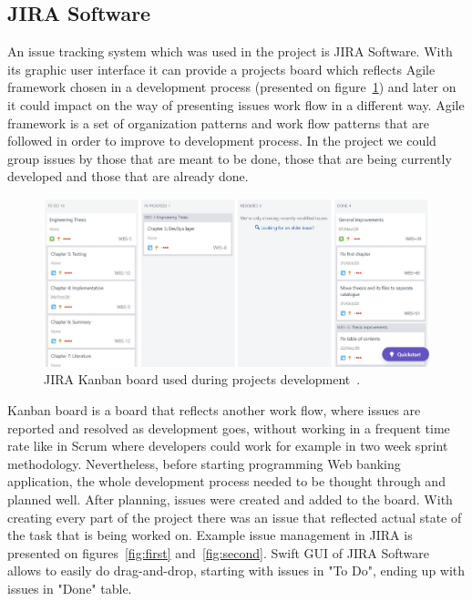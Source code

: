 \documentclass[a4paper,12pt]{book}
\newcommand\tab[1][1cm]{\hspace*{#1}}
\begin{document}
\subsection{JIRA Software}
{
\tab An issue tracking system which was used in the project is JIRA Software. With its graphic user interface it can provide a projects board  which reflects Agile framework chosen in a development process (presented on figure~\ref{fig:jiraboard}) and later on it could impact on the way of presenting issues work flow in a different way. Agile framework is a set of organization patterns and work flow patterns that are followed in order to improve to development process. In the project we could group issues by those that are meant to be done, those that are being currently developed and those that are already done.

\bigskip
\begin{figure}[H]
  \centering
    \includegraphics[width=1.0\textwidth]{kanban}
    \caption{JIRA Kanban board used during projects development~\cite{jiraboard}.}
    \label{fig:jiraboard}
\end{figure} 
    
\bigskip Kanban board is a board that reflects another work flow, where issues are reported and resolved as development goes, without working in a frequent time rate like in Scrum where developers could work for example in two week sprint methodology. Nevertheless, before starting programming Web banking application, the whole development process needed to be thought through and planned well. After planning, issues were created and added to the board. With creating every part of the project there was an issue that reflected actual state of the task that is being worked on. Example issue management in JIRA is presented on figures~\ref{fig:first} and~\ref{fig:second}. Swift GUI of JIRA Software allows to easily do drag-and-drop, starting with issues in "To Do", ending up with issues in "Done" table.
    
}
\end{document}
